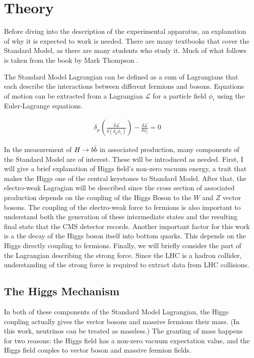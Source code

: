 \chapter{Theory} \label{ch:theory}

Before diving into the description of the experimental apparatus,
an explanation of why it is expected to work is needed.
There are many textbooks that cover the Standard Model, as there are many students who study it.
Much of what follows is taken from the book by Mark Thompson \cite{Thomson:1529540}.

The Standard Model Lagrangian can be defined as a sum of Lagrangians that each describe
the interactions between different fermions and bosons.
Equations of motion can be extracted from a Lagrangian $\mathcal{L}$
for a particle field $\phi_i$ using the Euler-Lagrange equations.

\begin{gather}
  \delta_\mu\left(\frac{\delta \mathcal{L}}{\delta(\delta_\mu \phi_i)}\right) -
  \frac{\delta \mathcal{L}}{\delta \phi_i} = 0
\end{gather}

In the measurement of $H\rightarrow b\bar{b}$ in associated production,
many components of the Standard Model are of interest.
These will be introduced as needed.
First, I will give a brief explanation of Higgs field's non-zero vacuum energy,
a trait that makes the Higgs one of the central keystones to Standard Model.
After that, the electro-weak Lagragian will be described since
the cross section of associated production depends on
the coupling of the Higgs Boson to the $W$ and $Z$ vector bosons.
The coupling of the electro-weak force to fermions is also important to
understand both the generation of these intermediate states and
the resulting final state that the CMS detector records.
Another important factor for this work is a the decay of the Higgs boson itself into bottom quarks.
This depends on the Higgs directly coupling to fermions.
Finally, we will briefly consider the part of the Lagrangian describing the strong force.
Since the LHC is a hadron collider,
understanding of the strong force is required to extract data from LHC collisions.

\section{The Higgs Mechanism}

In both of these components of the Standard Model Lagrangian,
the Higgs coupling actually gives the vector bosons and massive fermions their mass.
(In this work, neutrinos can be treated as massless.)
The granting of mass happens for two reasons:
the Higgs field has a non-zero vacuum expectation value,
and the Higgs field couples to vector boson and massive fermion fields.

